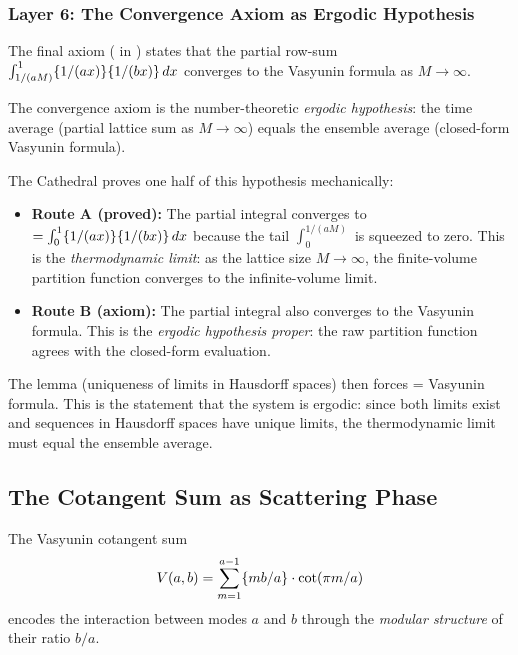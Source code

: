 \documentclass[11pt,a4paper]{article}
\begin{document}
\subsubsection{Layer 6: The Convergence Axiom as Ergodic Hypothesis}

The final axiom ( in
) states that the partial row-sum
$\int_{1/(aM)}^1 \{1/(ax)\}\{1/(bx)\}\,dx$ converges
to the Vasyunin formula as $M \to \infty$.

\begin{principle}
The convergence axiom is the number-theoretic \emph{ergodic hypothesis}:
the time average (partial lattice sum as $M \to \infty$) equals the
ensemble average (closed-form Vasyunin formula).

The Cathedral proves one half of this hypothesis mechanically:
\begin{itemize}
  \item \textbf{Route A (proved):} The partial integral converges to
    ~$= \int_0^1 \{1/(ax)\}\{1/(bx)\}\,dx$
    because the tail $\int_0^{1/(aM)}$ is squeezed to zero.
    This is the \emph{thermodynamic limit}: as the lattice size
    $M \to \infty$, the finite-volume partition function converges
    to the infinite-volume limit.
  \item \textbf{Route B (axiom):} The partial integral also converges
    to the Vasyunin formula. This is the \emph{ergodic hypothesis proper}:
    the raw partition function agrees with the closed-form evaluation.
\end{itemize}
The  lemma (uniqueness of limits in
Hausdorff spaces) then forces  = Vasyunin formula.
This is the statement that the system is ergodic: since both limits
exist and sequences in Hausdorff spaces have unique limits, the
thermodynamic limit must equal the ensemble average.
\end{principle}

\subsection{The Cotangent Sum as Scattering Phase}

The Vasyunin cotangent sum
\[
  V(a,b) = \sum_{m=1}^{a-1} \{mb/a\} \cdot \cot(\pi m/a)
\]
encodes the interaction between modes $a$ and $b$ through the
\emph{modular structure} of their ratio $b/a$.
\end{document}
